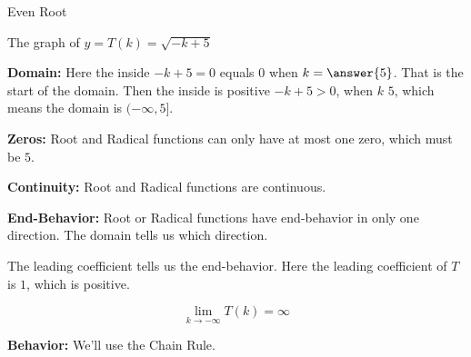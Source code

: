 \documentclass{ximera}
\begin{document}
\begin{example} Even Root

The graph of $y = T(k) = \sqrt{-k+5}$


\begin{image}
\end{image}


\textbf{Domain:} 
Here the inside $-k+5=0$ equals $0$ when $k=\answer{5}$.  That is the start of the domain.  Then the inside is positive $-k+5>0$, when $k$ \wordChoice{\choice[correct]{$<$} \choice {$>$}}  $5$, which means the domain is $(-\infty,5]$.


\textbf{Zeros:}  Root and Radical functions can only have at most one zero, which must be $5$.


\textbf{Continuity:} Root and Radical functions are continuous. 


\textbf{End-Behavior:} Root or Radical functions have end-behavior in only one direction. The domain tells us which direction.  

The leading coefficient tells us the end-behavior. Here the leading coefficient of $T$ is $1$, which is positive.


\[  \lim\limits_{k \to -\infty} T(k) = \infty   \]







\textbf{Behavior:}  We'll use the Chain Rule.


\end{example}
\end{document}
